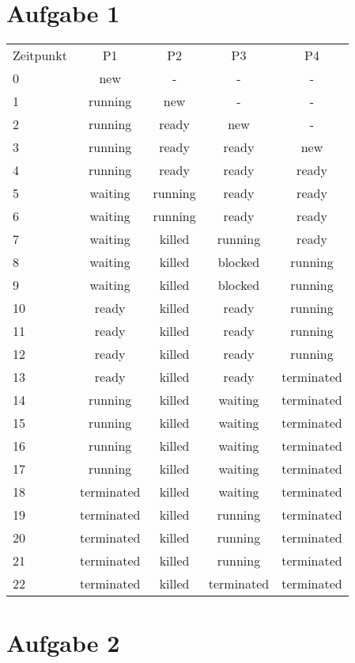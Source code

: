 \documentclass[numbers=noendperiod]{scrartcl}
\begin{document}
\section{Aufgabe 1}
\begin{tabular}{lcccc}
	Zeitpunkt & P1 & P2 & P3 & P4 \\
	0 & new & - & - & - \\
	1 & running & new & - & - \\
	2 & running & ready  & new & - \\
	3 & running & ready & ready & new \\
	4 & running & ready & ready & ready \\
	5 & waiting & running & ready & ready \\
	6 & waiting & running & ready & ready \\
	7 & waiting & killed & running & ready \\
	8 & waiting & killed & blocked & running \\
	9 & waiting & killed & blocked & running \\
	10 & ready & killed & ready & running \\
	11 & ready & killed & ready & running \\
	12 & ready & killed & ready & running \\
	13 & ready & killed & ready & terminated \\
	14 & running & killed & waiting & terminated \\
	15 & running & killed & waiting & terminated \\
	16 & running & killed & waiting & terminated \\
	17 & running & killed & waiting & terminated \\
	18 & terminated & killed & waiting & terminated \\
	19 & terminated & killed & running & terminated \\
	20 & terminated & killed & running & terminated \\
	21 & terminated & killed & running & terminated \\
	22 & terminated & killed & terminated & terminated \\



\end{tabular}	
\section{Aufgabe 2}
	
\end{document}
